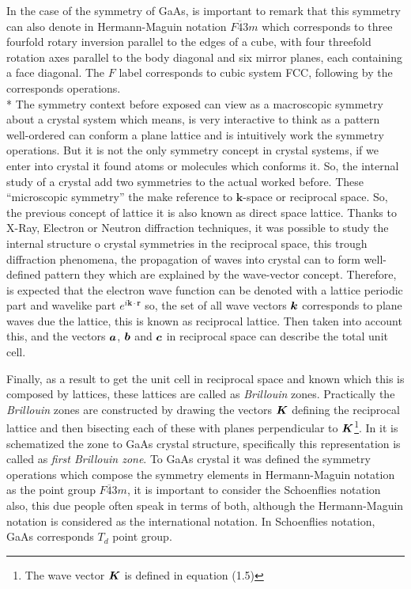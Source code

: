 In the case of the symmetry of GaAs, is important to remark that this symmetry can also denote in Hermann-Maguin notation  $F\overline{4}3m$ which corresponds to three fourfold rotary inversion parallel to the edges of a cube, with four threefold rotation axes parallel to the body diagonal and six mirror planes, each containing a face diagonal\cite{chatterjee2008crystallography}. The $F$ label corresponds to cubic system FCC, following by the corresponds operations.  \\*
The symmetry context before exposed can view as a macroscopic symmetry about  a crystal system  which means, is very interactive to think as a pattern well-ordered can conform a plane lattice and is intuitively work the symmetry operations. But it is not  the only  symmetry concept in crystal systems, if  we enter into crystal it found atoms or molecules which conforms it. So, the internal study of a crystal add two symmetries to the actual worked before. These ``microscopic symmetry''\cite{chatterjee2008crystallography} the make reference to $\boldsymbol{k}$-space or reciprocal space.  So, the previous concept of lattice it is also known as direct space lattice.
Thanks to X-Ray, Electron or Neutron diffraction techniques, it was possible to study the internal structure o crystal symmetries in the reciprocal space, this trough diffraction phenomena, the propagation of waves into crystal can to form well-defined pattern they which are explained by the wave-vector concept\cite{malgrange2014symmetry,powell2010symmetry}. Therefore, is expected  that the electron wave function can be denoted with a lattice periodic part  and wavelike part $e^{i\boldsymbol{k}\cdotp\boldsymbol{r}}$ so, the set of all wave vectors $\boldsymbol k$ corresponds to plane waves due the lattice, this is known as reciprocal lattice\cite{ashcroft1976solid}.  
Then taken into account this, and  the vectors  $\boldsymbol a$, $\boldsymbol b$ and $\boldsymbol c$ in reciprocal space can describe the total unit cell\cite{ashcroft1976solid,powell2010symmetry}. 

Finally, as a result to get the unit cell in reciprocal space and known which this is composed by lattices, these lattices are called as \emph{Brillouin} zones. Practically the \emph{Brillouin} zones are constructed by drawing the vectors $\boldsymbol K$ defining the reciprocal lattice and then bisecting each of these with planes perpendicular to  $\boldsymbol K$\cite{powell2010symmetry}\footnote{The wave vector  $\boldsymbol K$ is defined in\cite{powell2010chapter1} equation (1.5)}. In  it is schematized the \brill zone to GaAs crystal structure, specifically this representation is called as \emph{ first Brillouin zone}.
To GaAs crystal it was defined the symmetry operations which compose the symmetry elements in Hermann-Maguin notation as the  point group  $F\overline{4}3m$, it is important to consider the Schoenflies notation also,  this due people often speak in terms of both, although the Hermann-Maguin notation is considered as the international notation. In Schoenflies notation, GaAs corresponds $T_{d}$ point group. 

